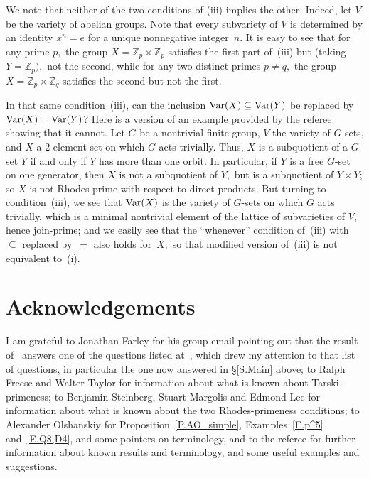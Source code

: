 \documentclass{amsart}
\numberwithin{equation}{section}
\numberwithin{theorem}{section}
\newcommand{\Z}{\mathbb{Z}}
\begin{document}
We note that neither of the two conditions of (iii) implies the other.
Indeed, let $V$ be the variety of abelian groups.
Note that every subvariety of $V$ is determined by
an identity $x^n=e$ for a unique nonnegative integer~$n.$
It is easy to see that for any prime $p,$ the group $X=\Z_p\times\Z_p$
satisfies the first part of~(iii) but (taking $Y=\Z_p),$
not the second, while for any two distinct primes $p\neq q,$ the group
$X=\Z_p\times\Z_q$ satisfies the second but not the first.

In that same condition~(iii), can the inclusion
$\textup{Var}(X) \subseteq\textup{Var}(Y)$ be replaced by
$\textup{Var}(X)=\textup{Var}(Y)$?
Here is a version of an example provided by the referee
showing that it cannot.
Let $G$ be a nontrivial finite group, $V$ the variety
of $\!G\!$-sets, and $X$ a $\!2\!$-element set on which
$G$ acts trivially.
Thus, $X$ is a subquotient of a $\!G\!$-set $Y$ if and
only if $Y$ has more than one orbit.
In particular, if $Y$ is a free $\!G\!$-set on one generator,
then $X$ is not a subquotient of $Y,$ but is
a subquotient of $Y\times Y;$ so $X$ is not
Rhodes-prime with respect to direct products.
But turning to condition~(iii), we see that
$\textup{Var}(X)$ is the variety of $\!G\!$-sets
on which $G$ acts trivially, which is a minimal
nontrivial element of the lattice of subvarieties
of $V,$ hence join-prime; and we easily see that the
``whenever'' condition of~(iii) with $\subseteq$ replaced by~$=$ also
holds for~$X;$ so that modified version of~(iii) is not
equivalent to~(i).

\section{Acknowledgements}\label{S.ackn}
I am grateful to Jonathan Farley for his group-email pointing
out that the result of~\cite{YCor} answers one of the questions
listed at~\cite[p.\,263]{MMT}, which drew my attention to that list of
questions, in particular the one now answered
in \S\ref{S.Main} above; to Ralph Freese
and Walter Taylor for information about what is known about
Tarski-primeness; to Benjamin Steinberg,
Stuart Margolis
and Edmond Lee for information about what is known
about the two Rhodes-primeness conditions; to Alexander Olshanskiy
for Proposition~\ref{P.AO_simple}, Examples~\ref{E.p^5}
and~\ref{E.Q8,D4}, and some pointers on terminology, and
to the referee for further information about known results
and terminology, and some useful examples and suggestions.
\end{document}
